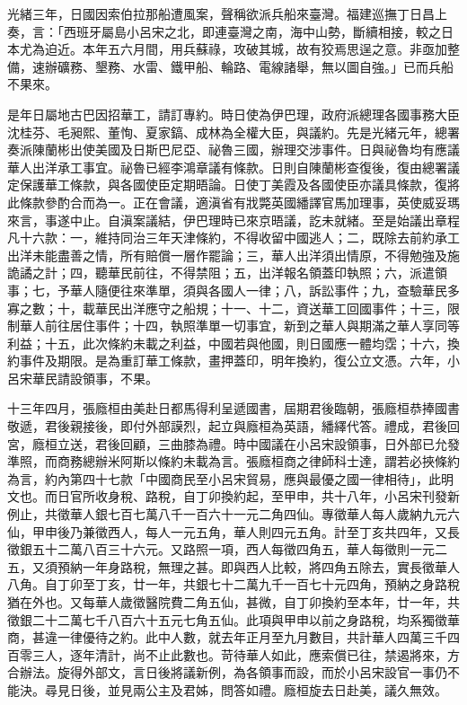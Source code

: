 \begin{pinyinscope}
光緒三年，日國因索伯拉那船遭風案，聲稱欲派兵船來臺灣。福建巡撫丁日昌上奏，言：「西班牙屬島小呂宋之北，即連臺灣之南，海中山勢，斷續相接，較之日本尤為迫近。本年五六月間，用兵蘇祿，攻破其城，故有狡焉思逞之意。非亟加整備，速辦礦務、墾務、水雷、鐵甲船、輪路、電線諸舉，無以圖自強。」已而兵船不果來。

是年日屬地古巴因招華工，請訂專約。時日使為伊巴理，政府派總理各國事務大臣沈桂芬、毛昶熙、董恂、夏家鎬、成林為全權大臣，與議約。先是光緒元年，總署奏派陳蘭彬出使美國及日斯巴尼亞、祕魯三國，辦理交涉事件。日與祕魯均有應議華人出洋承工事宜。祕魯已經李鴻章議有條款。日則自陳蘭彬查復後，復由總署議定保護華工條款，與各國使臣定期晤論。日使丁美霞及各國使臣亦議具條款，復將此條款參酌合而為一。正在會議，適滇省有戕斃英國繙譯官馬加理事，英使威妥瑪來言，事遂中止。自滇案議結，伊巴理時已來京晤議，訖未就緒。至是始議出章程凡十六款：一，維持同治三年天津條約，不得收留中國逃人；二，既除去前約承工出洋未能盡善之情，所有賠償一層作罷論；三，華人出洋須出情原，不得勉強及施詭譎之計；四，聽華民前往，不得禁阻；五，出洋報名領蓋印執照；六，派遣領事；七，予華人隨便往來準單，須與各國人一律；八，訴訟事件；九，查驗華民多寡之數；十，載華民出洋應守之船規；十一、十二，資送華工回國事件；十三，限制華人前往居住事件；十四，執照準單一切事宜，新到之華人與期滿之華人享同等利益；十五，此次條約未載之利益，中國若與他國，則日國應一體均霑；十六，換約事件及期限。是為重訂華工條款，畫押蓋印，明年換約，復公立文憑。六年，小呂宋華民請設領事，不果。

十三年四月，張廕桓由美赴日都馬得利呈遞國書，屆期君後臨朝，張廕桓恭捧國書敬遞，君後親接後，即付外部謨烈，起立與廕桓為英語，繙繹代答。禮成，君後回宮，廕桓立送，君後回顧，三曲膝為禮。時中國議在小呂宋設領事，日外部已允發準照，而商務總辦米阿斯以條約未載為言。張廕桓商之律師科士達，謂若必挾條約為言，約內第四十七款「中國商民至小呂宋貿易，應與最優之國一律相待」，此明文也。而日官所收身稅、路稅，自丁卯換約起，至甲申，共十八年，小呂宋刊發新例止，共徵華人銀七百七萬八千一百六十一元二角四仙。專徵華人每人歲納九元六仙，甲申後乃兼徵西人，每人一元五角，華人則四元五角。計至丁亥共四年，又長徵銀五十二萬八百三十六元。又路照一項，西人每徵四角五，華人每徵則一元二五，又須預納一年身路稅，無理之甚。即與西人比較，將四角五除去，實長徵華人八角。自丁卯至丁亥，廿一年，共銀七十二萬九千一百七十元四角，預納之身路稅猶在外也。又每華人歲徵醫院費二角五仙，甚微，自丁卯換約至本年，廿一年，共徵銀二十二萬七千八百六十五元七角五仙。此項與甲申以前之身路稅，均系獨徵華商，甚違一律優待之約。此中人數，就去年正月至九月數目，共計華人四萬三千四百零三人，逐年清計，尚不止此數也。苛待華人如此，應索償已往，禁遏將來，方合辦法。旋得外部文，言日後將議新例，為各領事而設，而於小呂宋設官一事仍不能決。尋見日後，並見兩公主及君姊，問答如禮。廕桓旋去日赴美，議久無效。


\end{pinyinscope}
